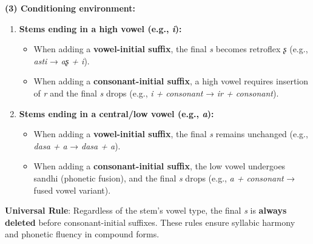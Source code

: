 \documentclass[12pt]{article}
\begin{document}
\bigskip

\noindent \textbf{(3) Conditioning environment:}

\begin{enumerate}[label=\arabic*., leftmargin=*]
  \item \textbf{Stems ending in a high vowel (e.g., \textit{i}):}
  \begin{itemize}[label=--]
      \item When adding a \textbf{vowel-initial suffix}, the final \textit{s} becomes retroflex \textit{ʂ} (e.g., \textit{asti} → \textit{aʂ + i}).
      \item When adding a \textbf{consonant-initial suffix}, a high vowel requires insertion of \textit{r} and the final \textit{s} drops (e.g., \textit{i + consonant} → \textit{ir + consonant}).
  \end{itemize}
  
  \item \textbf{Stems ending in a central/low vowel (e.g., \textit{a}):}
  
\begin{itemize}[label=--]
      \item When adding a \textbf{vowel-initial suffix}, the final \textit{s} remains unchanged (e.g., \textit{dasa + a} → \textit{dasa + a}).
      \item When adding a \textbf{consonant-initial suffix}, the low vowel undergoes sandhi (phonetic fusion), and the final \textit{s} drops (e.g., \textit{a + consonant} → fused vowel variant).
  \end{itemize}
\end{enumerate}

\textbf{Universal Rule}: Regardless of the stem’s vowel type, the final \textit{s} is \textbf{always deleted} before consonant-initial suffixes. These rules ensure syllabic harmony and phonetic fluency in compound forms.
\end{document}
